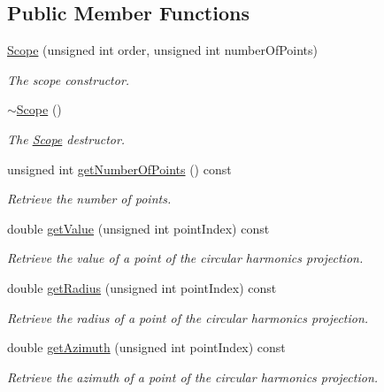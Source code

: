 \subsection*{Public Member Functions}
\begin{DoxyCompactItemize}
\item 
\hyperlink{class_hoa2_d_1_1_scope_aaa6b3e208eb06bef06b59264c84a5364}{Scope} (unsigned int order, unsigned int number\-Of\-Points)
\begin{DoxyCompactList}\small\item\em The scope constructor. \end{DoxyCompactList}\item 
\hyperlink{class_hoa2_d_1_1_scope_a29c9191706ff1377efab0720cacbc448}{$\sim$\-Scope} ()
\begin{DoxyCompactList}\small\item\em The \hyperlink{class_hoa2_d_1_1_scope}{Scope} destructor. \end{DoxyCompactList}\item 
unsigned int \hyperlink{class_hoa2_d_1_1_scope_adfabc2c966855a3b79a818a503655591}{get\-Number\-Of\-Points} () const 
\begin{DoxyCompactList}\small\item\em Retrieve the number of points. \end{DoxyCompactList}\item 
double \hyperlink{class_hoa2_d_1_1_scope_a69f278dc5e8b40c0f58f6e684078d6eb}{get\-Value} (unsigned int point\-Index) const 
\begin{DoxyCompactList}\small\item\em Retrieve the value of a point of the circular harmonics projection. \end{DoxyCompactList}\item 
double \hyperlink{class_hoa2_d_1_1_scope_a552af7083cc302db946910f68f928f62}{get\-Radius} (unsigned int point\-Index) const 
\begin{DoxyCompactList}\small\item\em Retrieve the radius of a point of the circular harmonics projection. \end{DoxyCompactList}\item 
double \hyperlink{class_hoa2_d_1_1_scope_aa7fff00ef13e8be9c9cd0774301ed258}{get\-Azimuth} (unsigned int point\-Index) const 
\begin{DoxyCompactList}\small\item\em Retrieve the azimuth of a point of the circular harmonics projection. \end{DoxyCompactList}\item 

\end{DoxyCompactItemize}

